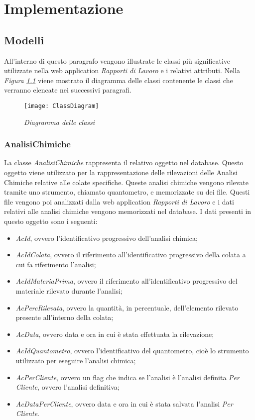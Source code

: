 \chapter{Implementazione}
  \label{chapter_implementazione}
  \section{Modelli}
  All'interno di questo paragrafo vengono illustrate le classi più significative utilizzate nella web application
  \textit{Rapporti di Lavoro} e i relativi attributi. Nella \textit{Figura \ref{fig:ClassDiagram}} viene mostrato il
  diagramma delle classi contenente le classi che verranno elencate nei successivi paragrafi.

  \begin{figure}[H]
    \texttt{[image: ClassDiagram]}
    \centering
    \caption{\textit{Diagramma delle classi}}
    \label{fig:ClassDiagram}
  \end{figure}

  \subsection{AnalisiChimiche}
  La classe \textit{AnalisiChimiche} rappresenta il relativo oggetto nel database. Questo oggetto viene utilizzato per la
  rappresentazione delle rilevazioni delle Analisi Chimiche relative alle colate specifiche. Queste analisi chimiche vengono
  rilevate tramite uno strumento, chiamato quantometro, e memorizzate su dei file. Questi file vengono poi analizzati dalla
  web application \textit{Rapporti di Lavoro} e i dati relativi alle analisi chimiche vengono memorizzati nel database. I dati
  presenti in questo oggetto sono i seguenti:
  \begin{itemize}
    \item \textit{AcId}, ovvero l'identificativo progressivo dell'analisi chimica;
    \item \textit{AcIdColata}, ovvero il riferimento all'identificativo progressivo della colata a cui fa riferimento
    l'analisi;
    \item \textit{AcIdMateriaPrima}, ovvero il riferimento all'identificativo progressivo del materiale rilevato durante
    l'analisi;
    \item \textit{AcPercRilevata}, ovvero la quantità, in percentuale, dell'elemento rilevato presente all'interno della
    colata;
    \item \textit{AcData}, ovvero data e ora in cui è stata effettuata la rilevazione;
    \item \textit{AcIdQuantometro}, ovvero l'identificativo del quantometro, cioè lo strumento utilizzato per eseguire
    l'analisi chimica;
    \item \textit{AcPerCliente}, ovvero un flag che indica se l'analisi è l'analisi definita \textit{Per Cliente},
    ovvero l'analisi definitiva;
    \item \textit{AcDataPerCliente}, ovvero data e ora in cui è stata salvata l'analisi \textit{Per Cliente}.
  \end{itemize}

